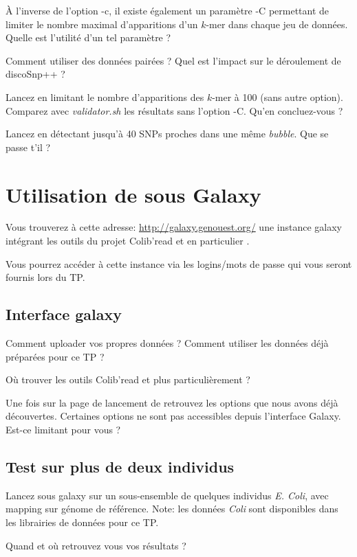 \qu À l'inverse de l'option -c, il existe également un paramètre -C permettant de limiter le nombre maximal d'apparitions d'un $k$-mer dans chaque jeu de données. Quelle est l'utilité d'un tel paramètre ? 

\qu Comment utiliser des données pairées ? Quel est l'impact sur le déroulement de discoSnp++ ?

\qu Lancez \discopp en limitant le nombre d'apparitions des $k$-mer à 100 (sans autre option). Comparez avec \emph{validator.sh} les résultats sans l'option -C. Qu'en concluez-vous ?

\qu Lancez \discopp en détectant jusqu'à 40 SNPs proches dans une même \emph{bubble}. Que se passe t'il ? 

\section*{Utilisation de \discopp sous Galaxy}
Vous trouverez à cette adresse: \url{http://galaxy.genouest.org/} une instance galaxy intégrant les outils du projet Colib'read et en particulier \discopp.

Vous pourrez accéder à cette instance via les logins/mots de passe qui vous seront fournis lors du TP. 

\subsection*{Interface galaxy}
\qu {} Comment uploader vos propres données ? Comment utiliser les données déjà préparées pour ce TP ?

\qu {} Où trouver les outils Colib'read et plus particulièrement \discopp ?

\qu Une fois sur la page de lancement de \discopp retrouvez les options que nous avons déjà découvertes. Certaines options ne sont pas accessibles depuis l'interface Galaxy. Est-ce limitant pour vous ?

\subsection*{Test sur plus de deux individus}

\qu {} Lancez sous galaxy \discopp sur un sous-ensemble de quelques individus \emph{E. Coli}, avec mapping sur génome de référence. Note: les données \emph{Coli} sont disponibles dans les librairies de données pour ce TP. 

\qu Quand et où retrouvez vous vos résultats ?

